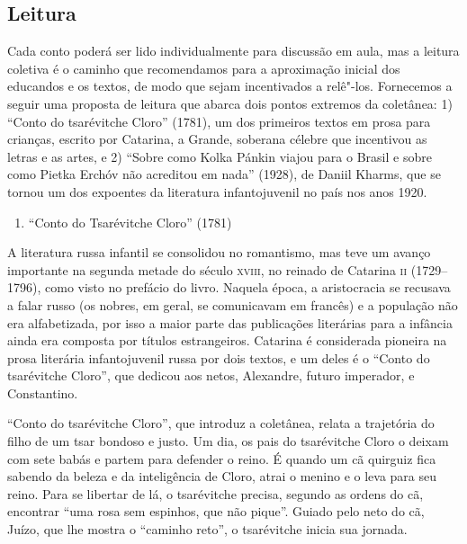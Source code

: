 \documentclass[11pt]{extarticle}
\begin{document}
\subsection{Leitura}

Cada conto poderá ser lido individualmente para discussão em aula, mas a
leitura coletiva é o caminho que recomendamos para a aproximação inicial
dos educandos e os textos, de modo que sejam incentivados a relê"-los.
Fornecemos a seguir uma proposta de leitura que abarca dois pontos
extremos da coletânea: 1) ``Conto do tsarévitche Cloro'' (1781), um dos
primeiros textos em prosa para crianças, escrito por Catarina, a Grande,
soberana célebre que incentivou as letras e as artes, e 2) ``Sobre como
Kolka Pánkin viajou para o Brasil e sobre como Pietka Erchóv não
acreditou em nada'' (1928), de Daniil Kharms, que se tornou um dos
expoentes da literatura infantojuvenil no país nos anos 1920.

\begin{enumerate}
\item ``Conto do Tsarévitche Cloro'' (1781)
\end{enumerate}

\reversemarginpar
\marginparwidth=5cm


A literatura russa infantil se consolidou no romantismo, mas teve um
avanço importante na segunda metade do século \textsc{xviii}, no reinado de
Catarina \textsc{ii} (1729--1796), como visto no prefácio do livro. Naquela
época, a aristocracia se recusava a falar russo (os nobres, em geral, se
comunicavam em francês) e a população não era alfabetizada, por isso a
maior parte das publicações literárias para a infância ainda era
composta por títulos estrangeiros. Catarina é considerada pioneira na
prosa literária infantojuvenil russa por dois textos, e um deles é o
``Conto do tsarévitche Cloro'', que dedicou aos netos, Alexandre, futuro
imperador, e Constantino.

``Conto do tsarévitche Cloro'', que introduz a coletânea,
relata a trajetória do filho de um tsar bondoso e justo. Um dia, os pais
do tsarévitche Cloro o deixam com sete babás e partem para defender o
reino. É quando um cã quirguiz fica sabendo da beleza e da inteligência
de Cloro, atrai o menino e o leva para seu reino. Para se libertar de
lá, o tsarévitche precisa, segundo as ordens do cã, encontrar ``uma rosa
sem espinhos, que não pique''. Guiado pelo neto do cã, Juízo, que lhe
mostra o ``caminho reto'', o tsarévitche inicia sua jornada.
\end{document}
